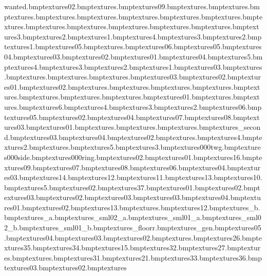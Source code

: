 wanted.bmp textures\spookytrack02.bmp textures\ghlabdoor.bmp textures\snowvan09.bmp textures\leaffrosttree.bmp textures\leaffrost.bmp textures\leaftree.bmp textures\leafred.bmp textures\leafpurple.bmp textures\leafgreen.bmp textures\leafblue.bmp textures\baubleblue.bmp textures\baubleyellow.bmp textures\baublepink.bmp textures\star.bmp textures\holly.bmp textures\presentblue.bmp textures\presentpink.bmp textures\white3.bmp textures\white2.bmp textures\white1.bmp textures\lp4.bmp textures\lp3.bmp textures\lp2.bmp textures\lp1.bmp textures\whackbit05.bmp textures\woodchip.bmp textures\splinter06.bmp textures\splinter05.bmp textures\splinter04.bmp textures\splinter03.bmp textures\splinter02.bmp textures\splinter01.bmp textures\whackbit04.bmp textures\bombbit5.bmp textures\bombbit4.bmp textures\bombbit3.bmp textures\bombbit2.bmp textures\bombbit1.bmp textures\whackbit03.bmp textures\cheese.bmp textures\candycane.bmp textures\spinningtop.bmp textures\rubixcube.bmp textures\snowbit03.bmp textures\snowbit02.bmp textures\snowbit01.bmp textures\whackbit02.bmp textures\legoyellow.bmp textures\legored.bmp textures\dartboard.bmp textures\playbrick.bmp textures\basketball.bmp textures\basballbat.bmp textures\beachball.bmp textures\americanfootball.bmp textures\whackbit01.bmp textures\domino.bmp textures\dice.bmp textures\clothes6.bmp textures\clothes4.bmp textures\clothes3.bmp textures\clothes2.bmp textures\snowvan06.bmp textures\snowvan05.bmp textures\snowvan02.bmp textures\snowvan04.bmp textures\snowvan07.bmp textures\snowvan08.bmp textures\snowvan03.bmp textures\snowvan01.bmp textures\safwheelgrip.bmp textures\safwheel.bmp textures\lorryunder.bmp textures\kingdome_second.bmp textures\snowtower03.bmp textures\snowtower04.bmp textures\snowtower02.bmp textures\tapend.bmp textures\rowboatwood4.bmp textures\rowboatwood2.bmp textures\rowboatwood.bmp textures\rowboatwood5.bmp textures\rowboatwood3.bmp textures\1000twg.bmp textures\1000side.bmp textures\1000ring.bmp textures\anvil02.bmp textures\anvil01.bmp textures\snowboard16.bmp textures\snowboard09.bmp textures\snowboard07.bmp textures\snowboard08.bmp textures\snowboard06.bmp textures\snowboard04.bmp textures\snowboard03.bmp textures\snowboard14.bmp textures\snowboard12.bmp textures\snowboard11.bmp textures\snowboard13.bmp textures\snowboard10.bmp textures\testtex5.bmp textures\postbox02.bmp textures\ceramictile37.bmp textures\snowbox01.bmp textures\cheesemousecrate02.bmp textures\cheesemousecrate03.bmp textures\snowbox02.bmp textures\snowbox03.bmp textures\snowman03.bmp textures\snowman04.bmp textures\snowman01.bmp textures\snowman02.bmp textures\snowcream13.bmp textures\electricfencesign.bmp textures\snowcream12.bmp textures\cablecar_b.bmp textures\cablecar_a.bmp textures\cablecar_sml02_a.bmp textures\cablecar_sml01_a.bmp textures\cablecar_sml02_b.bmp textures\cablecar_sml01_b.bmp textures\cablecar_floorr.bmp textures\cablecar_gen.bmp textures\cablecar05.bmp textures\cablecar04.bmp textures\cablecar03.bmp textures\cablecar02.bmp textures\snowlemon.bmp textures\sign26.bmp textures\sign35.bmp textures\sign34.bmp textures\sign15.bmp textures\sign32.bmp textures\sign27.bmp textures\snowtree.bmp textures\snow.bmp textures\sign31.bmp textures\sign21.bmp textures\sign33.bmp textures\sign36.bmp textures\igloo03.bmp textures\igloo02.bmp textures\